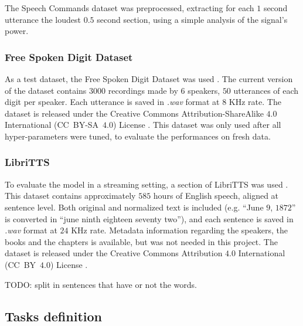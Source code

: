 The Speech Commands dataset was preprocessed, extracting for each $1$ second
utterance the loudest $0.5$ second section, using a simple analysis of the
signal's power.

\subsubsection{Free Spoken Digit Dataset}

As a test dataset, the Free Spoken Digit Dataset was used
\cite{zohar_jackson_2018_1342401}.
The current version of the dataset contains $3000$ recordings made by $6$
speakers, $50$ utterances of each digit per speaker.
Each utterance is saved in \textit{.wav} format at $8$ KHz rate.
The dataset is released under the Creative Commons 
Attribution-ShareAlike $4.0$ International (CC~BY-SA~$4.0$)
License \cite{ccbysa4}.
This dataset was only used after all hyper-parameters were tuned, to evaluate
the performances on fresh data.

\subsubsection{LibriTTS}

To evaluate the model in a streaming setting, a section of LibriTTS was used
\cite{zen2019libritts}.
This dataset contains approximately $585$ hours of English speech, aligned at
sentence level.
Both original and normalized text is included (e.g. ``June $9$, $1872$'' is
converted in ``june ninth eighteen seventy two''), and each sentence is saved
in \textit{.wav} format at $24$ KHz rate.
Metadata information regarding the speakers, the books and the chapters is
available, but was not needed in this project.
The dataset is released under the Creative Commons Attribution $4.0$
International (CC~BY~$4.0$) License \cite{ccby4}.

TODO: split in sentences that have or not the words.

\subsection{Tasks definition}

